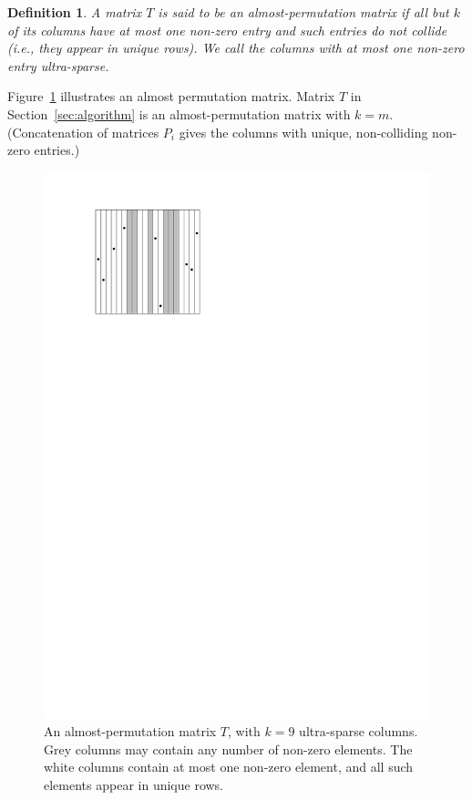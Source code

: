 \documentclass{article}
\newtheorem{definition}[theorem]{Definition}
\begin{document}
\begin{definition}
    A matrix $T$ is said to be an \emph{almost-permutation matrix} if all but
    $k$ of its columns have at most one non-zero entry and such entries do not
    collide (i.e., they appear in unique rows).
    We call the columns with at most one non-zero entry \emph{ultra-sparse}.
\end{definition}
%
Figure~\ref{fig:almost-permutation} illustrates an almost permutation matrix.
%
Matrix $T$ in Section~\ref{sec:algorithm} is an almost-permutation matrix with $k = m$.
(Concatenation of matrices $P_i$ gives the columns with unique, non-colliding
non-zero entries.)
%
\begin{figure}
    \centering
    \includegraphics{figs/almost-permutation}
    \caption{An almost-permutation matrix $T$, with $k = 9$ ultra-sparse columns.
             Grey columns may contain any number of non-zero elements. The white
             columns contain at most one non-zero element, and all such elements
             appear in unique rows.}
    \label{fig:almost-permutation}
\end{figure}
\end{document}
